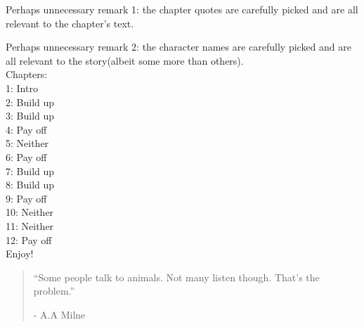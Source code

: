 \documentclass[smalldemyvopaper,11pt,twoside,onecolumn,openright,extrafontsizes]{memoir}
\begin{document}
Perhaps unnecessary remark 1: the chapter quotes are carefully picked and are all relevant to the chapter's text.

Perhaps unnecessary remark 2: the character names are carefully picked and are all relevant to the story(albeit some more than others).\\[1cm]
Chapters:\\
1: Intro\\
2: Build up\\
3: Build up\\
4: Pay off\\
5: Neither\\
6: Pay off\\
7: Build up\\
8: Build up\\
9: Pay off\\
10: Neither\\
11: Neither\\
12: Pay off\\





Enjoy!



\clearpage
\tableofcontents*

\clearpage


	

\clearpage

\vspace*{4.3cm}
\begin{localsize}{10}
  \begin{quote}
    “Some people talk to animals. Not many listen though. That's the problem.”
    \begin{flushright}- A.A Milne \end{flushright}
  \end{quote} 
\end{localsize}
\vspace{1cm}
\end{document}
